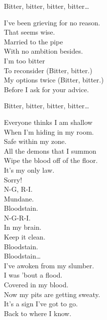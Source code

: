 
Bitter, bitter, bitter, bitter… \\


I've been grieving for no reason. \\
That seems wise. \\
Married to the pipe \\
With no ambition besides. \\

I'm too bitter \\
To reconsider (Bitter, bitter.) \\
My options twice (Bitter, bitter.) \\
Before I ask for your advice. \\


Bitter, bitter, bitter, bitter… \\




Everyone thinks I am shallow \\
When I'm hiding in my room. \\
Safe within my zone. \\
All the demons that I summon \\
Wipe the blood off of the floor. \\
It's my only law. \\

Sorry! \\

N-G, R-I. \\
Mundane. \\
Bloodstain. \\
N-G-R-I. \\
In my brain. \\
Keep it clean. \\
Bloodstain. \\

Bloodstain… \\

I've awoken from my slumber. \\
I was  'bout a flood. \\
Covered in my blood. \\
Now my pits are getting sweaty. \\
It's a sign I've got to go. \\
Back to where I know. \\

